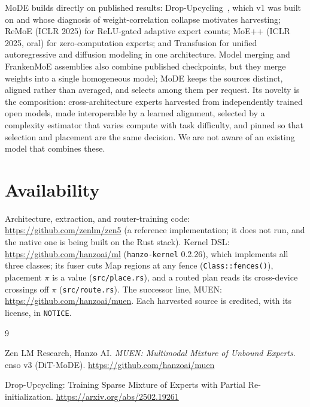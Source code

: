 \documentclass[11pt,a4paper]{article}
\begin{document}
MoDE builds directly on published results: Drop-Upcycling~\cite{dropupcycling}, which v1 was
built on and whose diagnosis of weight-correlation collapse motivates harvesting; ReMoE
(ICLR 2025) for ReLU-gated adaptive expert counts; MoE++ (ICLR 2025, oral) for zero-computation
experts; and Transfusion for unified autoregressive and diffusion modeling in one
architecture. Model merging and
FrankenMoE assemblies also combine published checkpoints, but they merge weights into a
single homogeneous model; MoDE keeps the sources distinct, aligned rather than averaged,
and selects among them per request. Its novelty is the composition: cross-architecture
experts harvested from independently trained open models, made interoperable by a learned
alignment, selected by a complexity estimator that varies compute with task difficulty,
and pinned so that selection and placement are the same decision. We are not aware of an
existing model that combines these.

\section*{Availability}

Architecture, extraction, and router-training code: \url{https://github.com/zenlm/zen5}
(a reference implementation; it does not run, and the native one is being built on the Rust
stack).
Kernel DSL: \url{https://github.com/hanzoai/ml} (\texttt{hanzo-kernel} 0.2.26), which
implements all three classes; its fuser cuts Map regions at any fence (\texttt{Class::fences()}),
placement $\pi$ is a value (\texttt{src/place.rs}), and a routed plan reads its cross-device
crossings off $\pi$ (\texttt{src/route.rs}).
The successor line, MUEN: \url{https://github.com/hanzoai/muen}. Each
harvested source is credited, with its license, in \texttt{NOTICE}.

\begin{thebibliography}{9}

Zen LM Research, Hanzo AI.
\emph{MUEN: Multimodal Mixture of Unbound Experts}. enso v3 (DiT-MoDE).
\url{https://github.com/hanzoai/muen}

Drop-Upcycling: Training Sparse Mixture of Experts with Partial Re-initialization.
\url{https://arxiv.org/abs/2502.19261}
\end{thebibliography}
\end{document}
